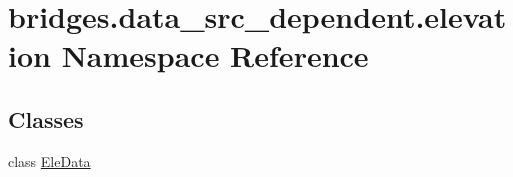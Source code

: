 \hypertarget{namespacebridges_1_1data__src__dependent_1_1elevation}{}\section{bridges.\+data\+\_\+src\+\_\+dependent.\+elevation Namespace Reference}
\label{namespacebridges_1_1data__src__dependent_1_1elevation}
\subsection*{Classes}
\begin{DoxyCompactItemize}
\item 
class \hyperlink{classbridges_1_1data__src__dependent_1_1elevation_1_1_ele_data}{Ele\+Data}
\end{DoxyCompactItemize}
